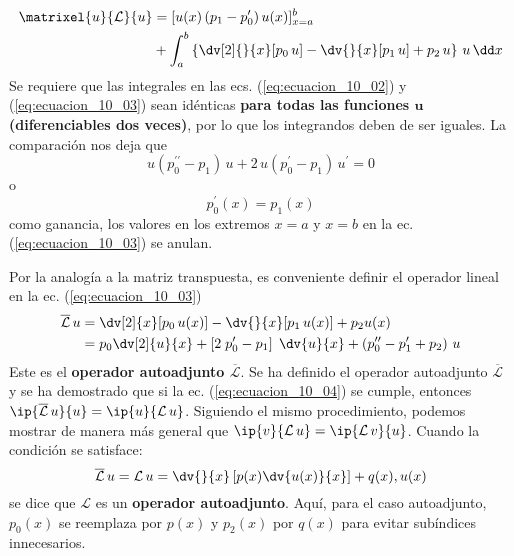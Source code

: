 \begin{align}
\begin{aligned}
\matrixel{u}{\mathcal{L}}{u} &= [ u(x) \, ( p_{1} - p_{0}^{\prime} ) \, u(x)]_{x=a}^{b} \\
&+ \int_{a}^{b} \left\{ \dv[2]{}{x} [p_{0} \, u] - \dv {}{x} [p_{1} \, u] + p_{2} \, u \right\} \, u \, \dd x
\end{aligned}
\label{eq:ecuacion_10_03}
\end{align}
Se requiere que las integrales en las ecs. (\ref{eq:ecuacion_10_02}) y (\ref{eq:ecuacion_10_03}) sean idénticas \textbf{para todas las funciones $\bm{u}$ (diferenciables dos veces)}, por lo que los integrandos deben de ser iguales. La comparación nos deja que
\[ u (p_{0}^{\prime \prime} - p_{1}) \, u + 2 \, u (p_{0}^{\prime} - p_{1}) \, u^{\prime} = 0 \]
o
\begin{equation}
p_{0}^{\prime} (x) = p_{1} (x)
\label{eq:ecuacion_10_04}
\end{equation}
como ganancia, los valores en los extremos $x=a$ y $x=b$ en la ec. (\ref{eq:ecuacion_10_03}) se anulan.
\par
Por la analogía a la matriz transpuesta, es conveniente definir el operador lineal en la ec. (\ref{eq:ecuacion_10_03})
\begin{align}
\begin{aligned}
\overline{\mathcal{L}} \, u &= \dv[2]{x} [ p_{0} \, u(x)] - \dv{}{x} [p_{1} \, u(x)] + p_{2} u(x) \\
&= p_{0} \dv[2]{u}{x} + \left[ 2 \; p_{0}^{\prime} - p_{1} \right] \; \dv{u}{x} + \left( p_{0}^{\prime \prime} - p_{1}^{\prime} + p_{2} \right) \, u
\label{eq:ecuacion_10_05}
\end{aligned}
\end{align}
Este es el \textbf{operador autoadjunto $\overline{\mathcal{L}}$}. 
Se ha definido el operador autoadjunto $\overline{\mathcal{L}}$ y se ha demostrado que si la ec. (\ref{eq:ecuacion_10_04}) se cumple, entonces $\ip{\overline{\mathcal{L}} \, u}{u} = \ip{u}{\mathcal{L} \, u}$. Siguiendo el mismo procedimiento, podemos mostrar de manera más general que $\ip{v}{\mathcal{L} \, u} = \ip{\mathcal{L} \, v}{u}$. Cuando la condición se satisface:
\begin{equation}
\overline{\mathcal{L}} \, u = \mathcal{L} \, u = \dv{}{x} \left[ p(x) \dv{u(x)}{x} \right] + q(x) , u(x)
\label{eq:ecuacion_10_06}
\end{equation}
se dice que $\mathcal{L}$ es un \textbf{operador autoadjunto}. Aquí, para el caso autoadjunto, $p_{0}(x)$ se reemplaza por $p(x)$ y $p_{2}(x)$ por $q(x)$ para evitar subíndices innecesarios.

